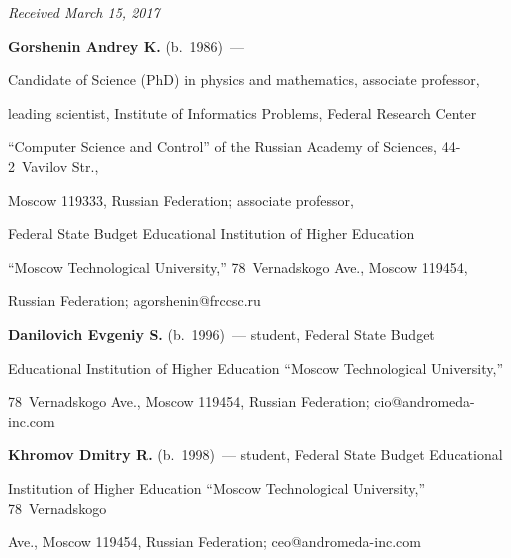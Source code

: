 \hfill{\small\textit{Received March 15, 2017}}








\Contr





\noindent


\textbf{Gorshenin Andrey K.} (b.\ 1986)~--- 


Candidate of Science (PhD) in physics and mathematics, associate professor, 


leading scientist, Institute of Informatics Problems, Federal Research Center 


``Computer Science and Control'' of the Russian Academy of Sciences, 44-2~Vavilov Str., 


Moscow 119333, Russian Federation; associate professor, 


Federal State Budget Educational Institution of Higher Education 


``Moscow Technological University,'' 78~Vernadskogo Ave., Moscow 119454, 


Russian Federation; \mbox{agorshenin@frccsc.ru}





\vspace*{3pt}





\noindent


\textbf{Danilovich Evgeniy S.} (b.\ 1996)~--- student, Federal State Budget 


Educational Institution of Higher Education ``Moscow Technological University,'' 


78~Vernadskogo Ave., Moscow 119454, Russian Federation; \mbox{cio@andromeda-inc.com}





\vspace*{3pt}





\noindent


\textbf{Khromov Dmitry R.} (b.\ 1998)~--- student, Federal State Budget Educational 


Institution of Higher Education ``Moscow Technological University,'' 78~Vernadskogo 


Ave., Moscow 119454, Russian Federation; \mbox{ceo@andromeda-inc.com}








\label{end\stat}








\renewcommand{\bibname}{\protect\rm Литература}



